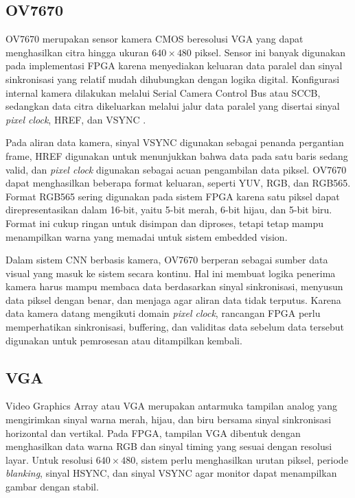   \subsection{OV7670}

  OV7670 merupakan sensor kamera CMOS beresolusi VGA yang dapat menghasilkan
  citra hingga ukuran $640 \times 480$ piksel. Sensor ini banyak digunakan pada
  implementasi FPGA karena menyediakan keluaran data paralel dan sinyal sinkronisasi
  yang relatif mudah dihubungkan dengan logika digital. Konfigurasi internal kamera
  dilakukan melalui Serial Camera Control Bus atau SCCB, sedangkan data citra
  dikeluarkan melalui jalur data paralel yang disertai sinyal \emph{pixel clock},
  HREF, dan VSYNC \cite{OmniVision2006OV7670}.

  Pada aliran data kamera, sinyal VSYNC digunakan sebagai penanda pergantian
  frame, HREF digunakan untuk menunjukkan bahwa data pada satu baris sedang valid,
  dan \emph{pixel clock} digunakan sebagai acuan pengambilan data piksel. OV7670
  dapat menghasilkan beberapa format keluaran, seperti YUV, RGB, dan RGB565.
  Format RGB565 sering digunakan pada sistem FPGA karena satu piksel dapat
  direpresentasikan dalam 16-bit, yaitu 5-bit merah, 6-bit hijau, dan 5-bit biru.
  Format ini cukup ringan untuk disimpan dan diproses, tetapi tetap mampu
  menampilkan warna yang memadai untuk sistem embedded vision.

  Dalam sistem CNN berbasis kamera, OV7670 berperan sebagai sumber data visual
  yang masuk ke sistem secara kontinu. Hal ini membuat logika penerima kamera harus
  mampu membaca data berdasarkan sinyal sinkronisasi, menyusun data piksel dengan
  benar, dan menjaga agar aliran data tidak terputus. Karena data kamera datang
  mengikuti domain \emph{pixel clock}, rancangan FPGA perlu memperhatikan
  sinkronisasi, buffering, dan validitas data sebelum data tersebut digunakan untuk
  pemrosesan atau ditampilkan kembali.

  \subsection{VGA}

  Video Graphics Array atau VGA merupakan antarmuka tampilan analog yang
  mengirimkan sinyal warna merah, hijau, dan biru bersama sinyal sinkronisasi
  horizontal dan vertikal. Pada FPGA, tampilan VGA dibentuk dengan menghasilkan
  data warna RGB dan sinyal timing yang sesuai dengan resolusi layar. Untuk
  resolusi $640 \times 480$, sistem perlu menghasilkan urutan piksel, periode
  \emph{blanking}, sinyal HSYNC, dan sinyal VSYNC agar monitor dapat menampilkan
  gambar dengan stabil.

